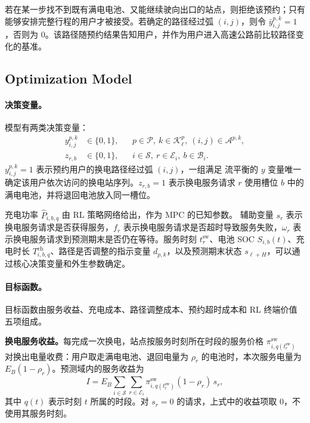 \documentclass[12pt,a4paper,UTF8]{ctexart}
\begin{document}
若在某一步找不到既有满电电池、又能继续驶向出口的站点，则拒绝该预约；只有能够安排完整行程的用户才被接受。若确定的路径经过弧 $(i,j)$，则令 $\bar y_{i,j}^{p,k}=1$，否则为 $0$。该路径随预约结果告知用户，并作为用户进入高速公路前比较路径变化的基准。


\subsection{Optimization Model}

\paragraph{决策变量。}

模型有两类决策变量：
\begin{equation}
\begin{aligned}
y_{i,j}^{p,k}&\in\{0,1\},
&&p\in\mathcal P,\ k\in\mathcal K_\ell^p,\ (i,j)\in\mathcal A^{p,k},\\
z_{r,b}&\in\{0,1\},
&&i\in\mathcal S,\ r\in\mathcal E_i,\ b\in\mathcal B_i.
\end{aligned}
\label{eq:decision_variables}
\end{equation}
$y_{i,j}^{p,k}=1$ 表示预约用户的换电路径经过弧 $(i,j)$，一组满足
流平衡的 $y$ 变量唯一确定该用户依次访问的换电站序列。$z_{r,b}=1$ 表示换电服务请求 $r$ 使用槽位 $b$ 中的满电电池，并将退回电池放入同一槽位。

充电功率 $\widehat P_{i,b,q}$ 由 RL 策略网络给出，作为 MPC 的已知参数。
辅助变量 $s_r$ 表示换电服务请求是否获得服务，$f_r$ 表示换电服务请求是否超时导致服务失败，$\omega_r$ 表示换电服务请求到预测期末是否仍在等待。服务时刻 $t_r^{\mathrm{sw}}$、电池 SOC $S_{i,b}(t)$、充电时长 $T_{i,b,q}^{\mathrm{ch}}$、路径是否调整的指示变量 $d_{p,k}$，以及预测期末状态 $s_{\ell+H}$，可以通过核心决策变量和外生参数确定。

\paragraph{目标函数。}
目标函数由服务收益、充电成本、路径调整成本、预约超时成本和 RL 终端价值五项组成。

\textbf{换电服务收益。}每完成一次换电，站点按服务时刻所在时段的服务价格 $\pi_{i,q(t_r^{\mathrm{sw}})}^{\mathrm{sw}}$ 对换出电量收费：用户取走满电电池、退回电量为 $\rho_r$ 的电池时，本次服务电量为 $E_B(1-\rho_r)$。预测域内的服务收益为
\begin{equation}
I
=E_B\sum_{i\in\mathcal S}
\sum_{r\in\mathcal E_i}
\pi_{i,q(t_r^{\mathrm{sw}})}^{\mathrm{sw}}(1-\rho_r)\,s_r,
\label{eq:income}
\end{equation}
其中 $q(t)$ 表示时刻 $t$ 所属的时段。对 $s_r=0$ 的请求，上式中的收益项取 $0$，不使用其服务时刻。
\end{document}
